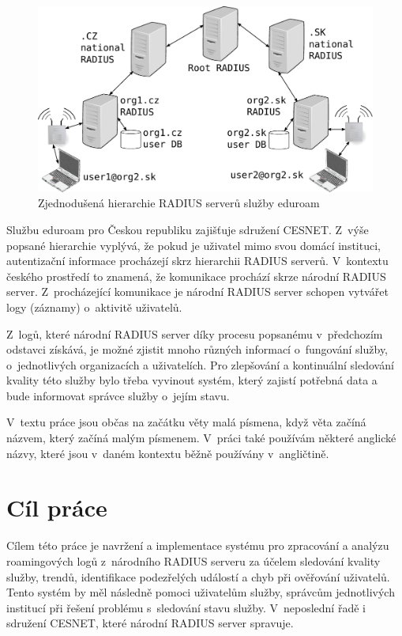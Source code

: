 \documentclass[thesis=M,czech]{FITthesis}[2012/06/26]
\begin{document}
\begin{introduction}
  \begin{figure}
    \centering
      \includegraphics[scale=0.75]{eduroam-hierarchy.pdf}
    \caption[Hierarchie služby eduroam]{Zjednodušená hierarchie RADIUS serverů služby eduroam \cite{eduroam_caletka_pdf}}
    \label{fig:eduroam_hierarchy}
  \end{figure}

  Službu eduroam pro Českou republiku zajišťuje sdružení CESNET. 
  Z~výše popsané hierarchie vyplývá, že pokud je uživatel mimo svou domácí instituci,
  autentizační informace procházejí skrz hierarchii RADIUS serverů. 
  V~kontextu českého prostředí to znamená, že komunikace prochází skrze národní RADIUS server.
  Z~procházející komunikace je národní RADIUS server schopen vytvářet
  logy (záznamy) o~aktivitě uživatelů.

  Z~logů, které národní RADIUS server díky procesu popsanému v~předchozím odstavci získává,
  je možné zjistit mnoho různých informací o~fungování služby, o~jednotlivých organizacích a uživatelích.
  Pro zlepšování a kontinuální sledování kvality této služby bylo třeba vyvinout systém, 
  který zajistí potřebná data a bude informovat správce služby o~jejím stavu.

  V~textu práce jsou občas na začátku věty malá písmena, když věta začíná názvem, který začíná malým písmenem.
  V~práci také používám některé anglické názvy, 
  které jsou v~daném kontextu běžně používány v~angličtině.

\end{introduction}

\chapter{Cíl práce}

  Cílem této práce je navržení a implementace systému pro zpracování a analýzu roamingových logů
  z~národního RADIUS serveru za účelem sledování kvality služby, trendů, 
  identifikace podezřelých událostí a chyb při ověřování uživatelů. 
  Tento systém by měl následně pomoci uživatelům služby, správcům jednotlivých institucí
  při řešení problému s~sledování stavu služby.
  V~neposlední řadě i sdružení CESNET, které národní RADIUS server spravuje.
\end{document}
